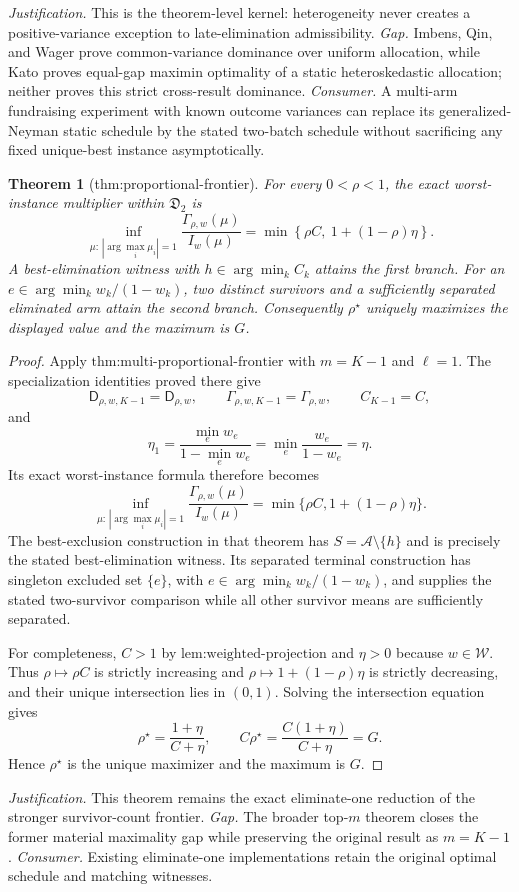 \documentclass{article}
\newtheorem{theorem}{Theorem}
\begin{document}
\par\smallskip\noindent \textit{Justification.} This is the theorem-level kernel: heterogeneity never creates a positive-variance exception to late-elimination admissibility. \textit{Gap.} Imbens, Qin, and Wager prove common-variance dominance over uniform allocation, while Kato proves equal-gap maximin optimality of a static heteroskedastic allocation; neither proves this strict cross-result dominance. \textit{Consumer.} A multi-arm fundraising experiment with known outcome variances can replace its generalized-Neyman static schedule by the stated two-batch schedule without sacrificing any fixed unique-best instance asymptotically.

\begin{theorem}[thm:proportional-frontier]\label{thm:proportional-frontier}
For every \(0<\rho<1\), the exact worst-instance multiplier within \(\mathfrak D_2\) is \[\inf_{\mu:\,|\arg\max_i\mu_i|=1}\frac{\Gamma_{\rho,w}(\mu)}{I_w(\mu)}=\min\left\{\rho C,\ 1+(1-\rho)\eta\right\}.\] A best-elimination witness with \(h\in\arg\min_k C_k\) attains the first branch. For an \(e\in\arg\min_k w_k/(1-w_k)\), two distinct survivors and a sufficiently separated eliminated arm attain the second branch. Consequently \(\rho^\star\) uniquely maximizes the displayed value and the maximum is \(G\).
\end{theorem}
\begin{proof}
Apply \(\text{thm:multi-proportional-frontier}\) with \(m=K-1\) and \(\ell=1\). The specialization identities proved there give
\[
 \mathsf D_{\rho,w,K-1}=\mathsf D_{\rho,w},\qquad
 \Gamma_{\rho,w,K-1}=\Gamma_{\rho,w},\qquad
 C_{K-1}=C,
\]
and
\[
 \eta_1=\frac{\min_e w_e}{1-\min_e w_e}
 =\min_e\frac{w_e}{1-w_e}=\eta.
\]
Its exact worst-instance formula therefore becomes
\[
 \inf_{\mu:\,|\arg\max_i\mu_i|=1}
 \frac{\Gamma_{\rho,w}(\mu)}{I_w(\mu)}
 =\min\{\rho C,1+(1-\rho)\eta\}.
\]
The best-exclusion construction in that theorem has \(S=\mathcal A\setminus\{h\}\) and is precisely the stated best-elimination witness. Its separated terminal construction has singleton excluded set \(\{e\}\), with \(e\in\arg\min_k w_k/(1-w_k)\), and supplies the stated two-survivor comparison while all other survivor means are sufficiently separated.

For completeness, \(C>1\) by \(\text{lem:weighted-projection}\) and \(\eta>0\) because \(w\in\mathcal W\). Thus \(\rho\mapsto\rho C\) is strictly increasing and \(\rho\mapsto1+(1-\rho)\eta\) is strictly decreasing, and their unique intersection lies in \((0,1)\). Solving the intersection equation gives
\[
 \rho^\star=\frac{1+\eta}{C+\eta},
 \qquad
 C\rho^\star=\frac{C(1+\eta)}{C+\eta}=G.
\]
Hence \(\rho^\star\) is the unique maximizer and the maximum is \(G\).
\end{proof}
\par\smallskip\noindent \textit{Justification.} This theorem remains the exact eliminate-one reduction of the stronger survivor-count frontier. \textit{Gap.} The broader top-\(m\) theorem closes the former material maximality gap while preserving the original result as \(m=K-1\). \textit{Consumer.} Existing eliminate-one implementations retain the original optimal schedule and matching witnesses.
\end{document}

